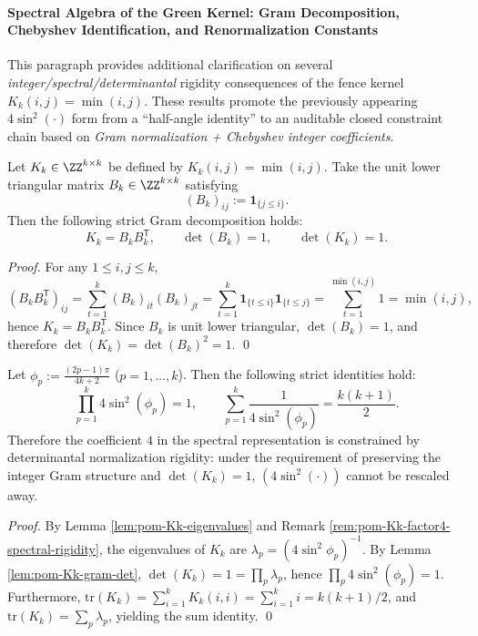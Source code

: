 \paragraph{Spectral Algebra of the Green Kernel: Gram Decomposition, Chebyshev Identification, and Renormalization Constants}
This paragraph provides additional clarification on several \emph{integer/spectral/determinantal} rigidity consequences of the fence kernel \(K_k(i,j)=\min(i,j)\).
These results promote the previously appearing \(4\sin^2(\cdot)\) form from a ``half-angle identity'' to an auditable closed constraint chain based on \emph{Gram normalization + Chebyshev integer coefficients}.

\begin{lemma}\label{lem:pom-Kk-gram-det}
Let \(K_k\in\ZZ^{k\times k}\) be defined by \(K_k(i,j)=\min(i,j)\).
Take the unit lower triangular matrix \(B_k\in\ZZ^{k\times k}\) satisfying
\[
(B_k)_{ij}:=\mathbf{1}_{\{j\le i\}}.
\]
Then the following strict Gram decomposition holds:
\[
K_k=B_kB_k^{\mathsf T},
\qquad
\det(B_k)=1,
\qquad
\det(K_k)=1.
\]
\end{lemma}
\begin{proof}
For any \(1\le i,j\le k\),
\[
(B_kB_k^{\mathsf T})_{ij}
=\sum_{t=1}^{k}(B_k)_{it}(B_k)_{jt}
=\sum_{t=1}^{k}\mathbf{1}_{\{t\le i\}}\mathbf{1}_{\{t\le j\}}
=\sum_{t=1}^{\min(i,j)}1
=\min(i,j),
\]
hence \(K_k=B_kB_k^{\mathsf T}\).
Since \(B_k\) is unit lower triangular, \(\det(B_k)=1\), and therefore \(\det(K_k)=\det(B_k)^2=1\). \qed
\end{proof}

\begin{corollary}\label{cor:pom-Kk-sine-product-sum}
Let
\(
\phi_p:=\frac{(2p-1)\pi}{4k+2}
\) (\(p=1,\dots,k\)).
Then the following strict identities hold:
\[
\prod_{p=1}^{k}4\sin^2(\phi_p)=1,
\qquad
\sum_{p=1}^{k}\frac{1}{4\sin^2(\phi_p)}=\frac{k(k+1)}{2}.
\]
Therefore the coefficient \(4\) in the spectral representation is constrained by determinantal normalization rigidity: under the requirement of preserving the integer Gram structure and \(\det(K_k)=1\),
\((4\sin^2(\cdot))\) cannot be rescaled away.
\end{corollary}
\begin{proof}
By Lemma \ref{lem:pom-Kk-eigenvalues} and Remark \ref{rem:pom-Kk-factor4-spectral-rigidity}, the eigenvalues of \(K_k\) are
\(
\lambda_p=(4\sin^2\phi_p)^{-1}
\).
By Lemma \ref{lem:pom-Kk-gram-det}, \(\det(K_k)=1=\prod_p\lambda_p\), hence \(\prod_p 4\sin^2(\phi_p)=1\).
Furthermore, \(\mathrm{tr}(K_k)=\sum_{i=1}^k K_k(i,i)=\sum_{i=1}^k i=k(k+1)/2\), and \(\mathrm{tr}(K_k)=\sum_p\lambda_p\), yielding the sum identity. \qed
\end{proof}

